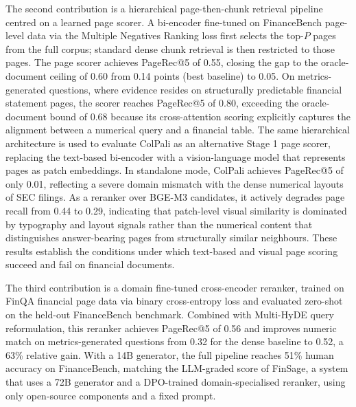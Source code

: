 \documentclass[12pt,twoside,maitrise]{dms}
\theoremstyle{definition}
\numberwithin{equation}{section}
\numberwithin{table}{chapter}
\numberwithin{figure}{chapter}
\begin{document}
The second contribution is a hierarchical page-then-chunk retrieval pipeline centred on
a learned page scorer. A bi-encoder fine-tuned on FinanceBench page-level data via the
Multiple Negatives Ranking loss first selects the top-$P$ pages from the full corpus; standard
dense chunk retrieval is then restricted to those pages. The page scorer achieves
PageRec@5 of 0.55, closing the gap to the oracle-document ceiling of 0.60 from 0.14 points
(best baseline) to 0.05. On metrics-generated questions, where evidence resides on
structurally predictable financial statement pages, the scorer reaches PageRec@5 of 0.80,
exceeding the oracle-document bound of 0.68 because its cross-attention scoring explicitly
captures the alignment between a numerical query and a financial table. The same
hierarchical architecture is used to evaluate ColPali as an alternative Stage 1 page scorer,
replacing the text-based bi-encoder with a vision-language model that represents pages as
patch embeddings. In standalone mode, ColPali achieves PageRec@5 of only 0.01,
reflecting a severe domain mismatch with the dense numerical layouts of SEC filings. As a
reranker over BGE-M3 candidates, it actively degrades page recall from 0.44 to 0.29,
indicating that patch-level visual similarity is dominated by typography and layout signals
rather than the numerical content that distinguishes answer-bearing pages from structurally
similar neighbours. These results establish the conditions under which text-based and
visual page scoring succeed and fail on financial documents.

The third contribution is a domain fine-tuned cross-encoder reranker, trained on FinQA
financial page data via binary cross-entropy loss and evaluated zero-shot on the held-out
FinanceBench benchmark. Combined with Multi-HyDE query reformulation, this reranker
achieves PageRec@5 of 0.56 and improves numeric match on metrics-generated questions
from 0.32 for the dense baseline to 0.52, a 63\% relative gain. With a 14B generator,
the full pipeline reaches 51\% human accuracy on FinanceBench, matching the LLM-graded
score of FinSage, a system that uses a 72B generator and a DPO-trained domain-specialised
reranker, using only open-source components and a fixed prompt.
\end{document}
